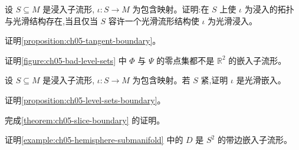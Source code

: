 \documentclass[../../main.tex]{subfiles}
\begin{document}
\begin{exercise}\label{exercise:ch05-p5-9}
设 $S\subseteq M$ 是浸入子流形, $\iota:S\to M$ 为包含映射。证明:在 $S$ 上使 $\iota$ 为浸入的拓扑与光滑结构存在,当且仅当 $S$ 容许一个光滑流形结构使 $\iota$ 为光滑浸入。
\end{exercise}

\begin{exercise}\label{exercise:ch05-p5-10}
证明\cref{proposition:ch05-tangent-boundary}。
\end{exercise}

\begin{exercise}\label{exercise:ch05-p5-11}
证明\cref{figure:ch05-bad-level-sets} 中 $\Phi$ 与 $\Psi$ 的零点集都不是 $\mathbb{R}^2$ 的嵌入子流形。
\end{exercise}

\begin{exercise}\label{exercise:ch05-p5-12}
设 $S\subseteq M$ 是浸入子流形, $\iota:S\to M$ 为包含映射。若 $S$ 紧,证明 $\iota$ 是光滑嵌入。
\end{exercise}

\begin{exercise}\label{exercise:ch05-p5-13}
证明\cref{proposition:ch05-level-sets-boundary}。
\end{exercise}

\begin{exercise}\label{exercise:ch05-p5-14}
完成\cref{theorem:ch05-slice-boundary} 的证明。
\end{exercise}

\begin{exercise}\label{exercise:ch05-p5-15}
证明\cref{example:ch05-hemisphere-submanifold} 中的 $D$ 是 $S^2$ 的带边嵌入子流形。
\end{exercise}
\end{document}
